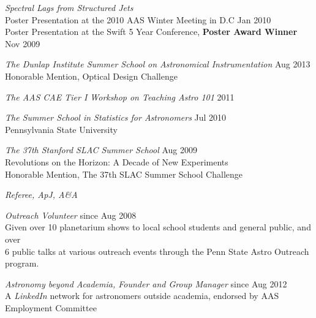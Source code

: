 \begin{small}
\vspace{10pt}
{\sl Spectral Lags from Structured Jets}  \\
Poster Presentation at the 2010 AAS Winter Meeting in D.C \hfill Jan
2010 \\
Poster Presentation at the Swift 5 Year Conference, {\bf Poster Award
  Winner} \hfill Nov 2009


 


{\sl The Dunlap Institute Summer School on Astronomical
  Instrumentation} \hfill Aug 2013 \\
Honorable Mention, Optical Design Challenge

\vspace{10pt}
{\sl The AAS CAE Tier I Workshop on Teaching Astro 101} \hfill 2011 

\vspace{10pt}
{\sl The Summer School in Statistics for Astronomers} \hfill  Jul 2010\\
Pennsylvania State University
% 

\vspace{10pt}
{\sl The 37th Stanford SLAC Summer School} \hfill        Aug 2009  \\
Revolutions on the Horizon: A Decade of New Experiments\\
Honorable Mention, The 37th SLAC Summer School Challenge
% 


\newpage
{} 


{\sl Referee, ApJ, A\&A} 
\vspace{10pt}

{\sl Outreach Volunteer} \hfill  since Aug 2008 \\
Given over 10 planetarium shows to local school students and general public, and over \\
6 public talks at various outreach events through the Penn State Astro
Outreach program. 
\vspace{10pt}

{\sl Astronomy beyond Academia, Founder and Group Manager} \hfill  since Aug 2012 \\
A {\it LinkedIn} network for astronomers outside academia,
endorsed by AAS Employment Committee
\vspace{10pt}


\end{small}
